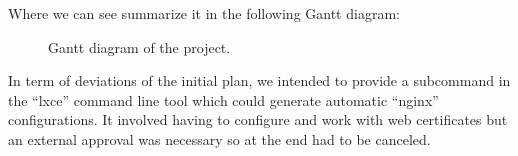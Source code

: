 \newpage
Where we can see summarize it in the following Gantt diagram:
\begin{figure}[H]
    
    \caption[Project's Gantt diagram]{\footnotesize{Gantt diagram of the project.}}
    \label{fig:gantt}
\end{figure}
In term of deviations of the initial plan, we intended to provide a subcommand in the ``lxce'' command line tool which could generate automatic
``nginx'' configurations. It involved having to configure and work
with web certificates but an external approval was necessary so at the
end had to be canceled.
\bigskip

